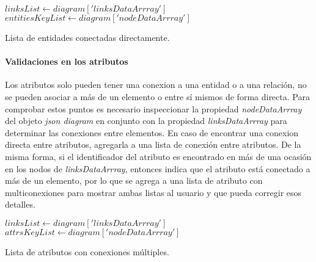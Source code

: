 \begin{algorithm}[H]

  $linksList \gets diagram['linksDataArrray']$\\
  $entitiesKeyList \gets diagram['nodeDataArrray']$\\
  
  \caption{Lista de entidades conectadas directamente.}
\end{algorithm}

\paragraph*{Validaciones en los atributos}

Los atributos solo pueden tener una conexion a una entidad o a una relación, no se pueden asociar a más de un elemento o entre sí mismos de forma directa. Para comprobar estos puntos es necesario inspeccionar la propiedad \textit{nodeDataArrray} del objeto \textit{json diagram} en conjunto con la propiedad \textit{linksDataArrray} para determinar las conexiones entre elementos. En caso de encontrar una conexion directa entre atributos, agregarla a una lista de conexión entre atributos. De la misma forma, si el identificador del atributo es encontrado en más de una ocasión en los nodos de \textit{linksDataArrray}, entonces indica que el atributo está conectado a más de un elemento, por lo que se agrega a una lista de atributo con multiconexiones para mostrar ambas listas al usuario y que pueda corregir esos detalles.

\begin{algorithm}[H]

  $linksList \gets diagram['linksDataArrray']$\\
  $attrsKeyList \gets diagram['nodeDataArrray']$\\

  \caption{Lista de atributos con conexiones múltiples.}
\end{algorithm}

